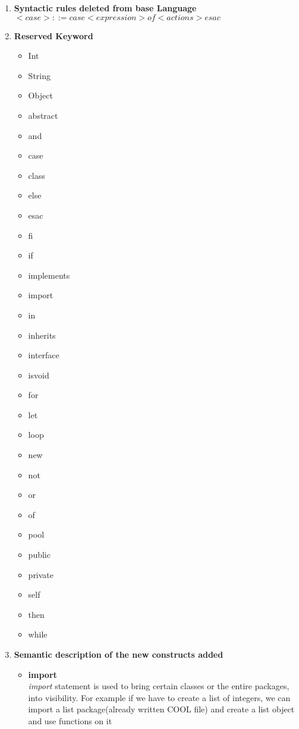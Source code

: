 \documentclass[11pt]{article}
\begin{document}
\begin{enumerate}
    \item \textbf{Syntactic rules deleted from base Language}\\
    $<case>                    ::= case <expression> of <actions> esac$\\
    \item \textbf{Reserved Keyword} 
    \begin{itemize}
        \item Int
        \item String
        \item Object
        \item abstract
        \item and
        \item case
        \item class
        \item else
        \item esac
        \item fi
        \item if 
        \item implements
        \item import
        \item in
        \item inherits
        \item interface
        \item isvoid
        \item for
        \item let
        \item loop
        \item new
        \item not
        \item or
        \item of
        \item pool
        \item public
        \item private
        \item self
        \item then
        \item while

    \end{itemize}
    \item \textbf{Semantic description of the new constructs added}
    \begin{itemize}
        \item \textbf{import}\\
        \textit{import} statement is used to bring certain classes or the entire packages, into visibility. For example if we have to create a list of integers, we can import a list package(already written COOL file) and create a list object and use functions on it


\end{itemize}
\end{enumerate}
\end{document}
